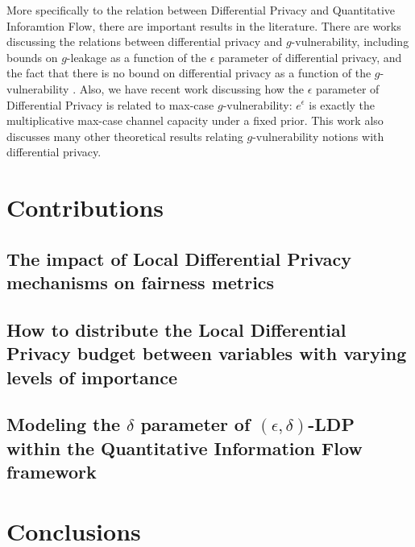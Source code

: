 \documentclass[conference]{IEEEtran}
\begin{document}
More specifically to the relation between Differential Privacy and Quantitative Inforamtion Flow, there are important results in the literature. There are works discussing the relations between differential privacy and $g$-vulnerability, including bounds on $g$-leakage as a function of the $\epsilon$ parameter of differential privacy, and the fact that there is no bound on differential privacy as a function of the $g$-vulnerability \cite{alvim2015information}. Also, we have recent work \cite{fernandes2022explaining} discussing how the $\epsilon$ parameter of Differential Privacy is related to max-case $g$-vulnerability: $e^\epsilon$ is exactly the multiplicative max-case channel capacity under a fixed prior. This work also discusses many other theoretical results relating $g$-vulnerability notions with differential privacy. 

\section{Contributions}

\subsection{The impact of Local Differential Privacy mechanisms on fairness metrics}

\subsection{How to distribute the Local Differential Privacy budget between variables with varying levels of importance}

\subsection{Modeling the $\delta$ parameter of $(\epsilon,\delta)$-LDP within the Quantitative Information Flow framework}

\section{Conclusions}




\end{document}
